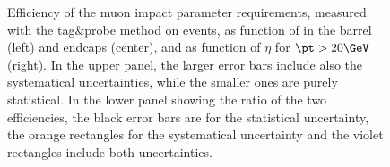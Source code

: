 \begin{figure}[htbp]
  \begin{center}
    \caption{Efficiency of the muon impact parameter requirements, measured with the tag\&probe method on \Z events, as function of \pt in the barrel (left) and endcaps (center), and as function of $\eta$ for $\pt > 20\GeV$ (right). In the upper panel, the larger error bars include also the systematical uncertainties, while the smaller ones are purely statistical. In the lower panel showing the ratio of the two efficiencies, the black error bars are for the statistical uncertainty, the orange rectangles for the systematical uncertainty and the violet rectangles include both uncertainties.}
    \label{fig:MuonIDEff_2}
\end{center}
\end{figure}

